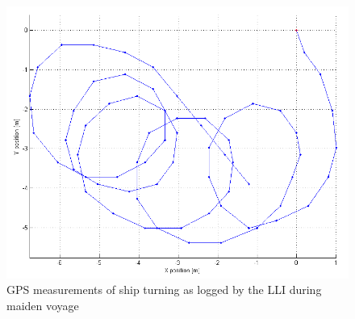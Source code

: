 \begin{figure}[htbp]
	\begin{center}
		\includegraphics[width=\textwidth]{img/maidenVoyage/ship_turning}     
		\caption{GPS measurements of ship turning as logged by the LLI during maiden voyage} 
		\label{fig:ship_turning}               
	\end{center}   
\end{figure}


